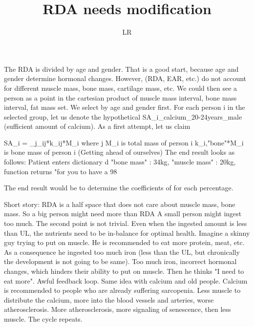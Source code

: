 \documentclass{article}
\title{RDA needs modification}
\author{LR}
\date{}
\begin{document}
\maketitle

The RDA is divided by age and gender. That is a good start, because age and gender determine hormonal changes.
However, (RDA, EAR, etc.) do not account for different muscle mass, bone mass, cartilage mass, etc.
We could then see a person as a point in the cartesian product of muscle mass interval, bone mass interval, fat mass set.
We select by age and gender first.
For each person i in the selected group, let us denote the hypothetical SA_{i}_{calcium}_{20-24years}_{male} (sufficient amount of calcium).
As a first attempt, let us claim

SA_{i} = \sum_{j}{\alpha_{ij}*k_{ij}*M_{i}}
where j 
M_{i} is total mass of person i
k_{i,"bone"}*M_{i} is bone mass of person i
(Getting ahead of ourselves) The end result looks as follows:
Patient enters dictionary d
{"bone mass" : 34kg,
"muscle mass" : 20kg,
}
function returns "for you to have a 98%


The end result would be to determine the coefficients of \vec{\alpha} for each percentage.

Short story:
RDA is a half space that does not care about muscle mass, bone mass.
So a big person might need more than RDA
A small person might ingest too much.
The second point is not trivial. Even when the ingested amount is less than UL, the nutrients need to be in-balance for optimal health.
Imagine a skinny guy trying to put on muscle. He is recommended to eat more protein, meat, etc. As a consequence he ingested too much iron (less than the UL, but chronically the development is not going to be same). Too much iron, incorrect hormonal changes, which hinders their ability to put on muscle. Then he thinks "I need to eat more". Awful feedback loop.
Same idea with calcium and old people.
Calcium is recommended to people who are already suffering sarcopenia. Less muscle to distribute the calcium, more into the blood vessels and arteries, worse atherosclerosis. More atherosclerosis, more signaling of senescence, then less muscle. The cycle repeats.
\end{document}
